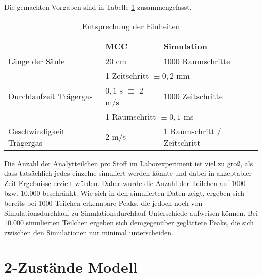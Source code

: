 Die gemachten Vorgaben sind in Tabelle \ref{einheiten} zusammengefasst.

\begin{table}[H]
\centering
\caption{Entsprechung der Einheiten}
\label{einheiten}
\begin{tabular}{|l||l|l|}
\hline
			  & MCC                 			& Simulation              \\ \hline \hline
Länge der Säule           & $20$ cm               		& $1000$ Raumschritte       \\ \hline
			  & \multicolumn{2}{l|}{1 Zeitschritt $\equiv 0,2$ mm} \\ \hline
Durchlaufzeit Trägergas   & $0,1$ s $\equiv$ $2$ m/s       	& $1000$ Zeitschritte       \\ \hline
			  & \multicolumn{2}{l|}{1 Raumschritt $\equiv 0,1$ ms} \\ \hline
Geschwindigkeit Trägergas & $2$ m/s 				& 1 Raumschritt / Zeitschritt \\ \hline
\end{tabular}
\end{table}

Die Anzahl der Analytteilchen pro Stoff im Laborexperiment ist viel zu groß, als dass tatsächlich jedes einzelne simuliert werden könnte und dabei in akzeptabler Zeit Ergebnisse erzielt würden. Daher wurde die Anzahl der Teilchen auf $1000$ bzw. $10.000$ beschränkt. Wie sich in den simulierten Daten zeigt, ergeben sich bereits bei $1000$ Teilchen erkennbare Peaks, die jedoch noch von Simulationsdurchlauf zu Simulationsdurchlauf Unterschiede aufweisen können. Bei $10.000$ simulierten Teilchen ergeben sich demgegenüber geglättete Peaks, die sich zwischen den Simulationen nur minimal unterscheiden.


\section{2-Zustände Modell}
\label{chapter:mod:2p}


